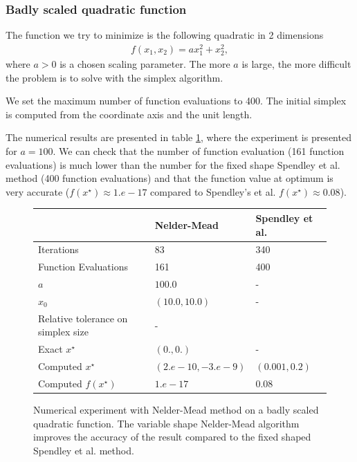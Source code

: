 \subsubsection{Badly scaled quadratic function}

The function we try to minimize is the following quadratic 
in 2 dimensions 
\begin{eqnarray}
\label{quadratic-nm-function2}
f(x_1,x_2) = a x_1^2 + x_2^2,
\end{eqnarray}
where $a>0$ is a chosen scaling parameter. 
The more $a$ is large, the more difficult the problem is 
to solve with the simplex algorithm.

We set the maximum number of function evaluations to 400.
The initial simplex is computed from the coordinate axis and the unit length.

The numerical results are presented in table \ref{fig-nm-numexp2-table},
where the experiment is presented for $a=100$. We can check that the 
number of function evaluation (161 function evaluations) is much lower than the number 
for the fixed shape Spendley et al. method (400 function evaluations)
and that the function value at optimum is very accurate ($f(x^\star)\approx 1.e-17$
compared to Spendley's et al. $f(x^\star) \approx 0.08$).

\begin{figure}[h]
\begin{center}
\begin{tabular}{|l|l|l|}
\hline
& Nelder-Mead & Spendley et al.\\
\hline
Iterations & 83  & 340 \\
Function Evaluations & 161 & 400 \\
$a$ & $100.0$ & - \\
$x_0$ & $(10.0,10.0)$ & - \\
Relative tolerance on simplex size & - \\
Exact $x^\star$ & $(0.,0.)$ & -\\
Computed $x^\star$ & $(2.e-10, -3.e-9)$& $(0.001,0.2)$\\
Computed $f(x^\star)$ & $1.e-17$ & $0.08$\\
\hline
\end{tabular}
\end{center}
\caption{Numerical experiment with Nelder-Mead method on a badly scaled quadratic function.
The variable shape Nelder-Mead algorithm improves the accuracy of the result compared
to the fixed shaped Spendley et al. method.}
\label{fig-nm-numexp2-table}
\end{figure}

